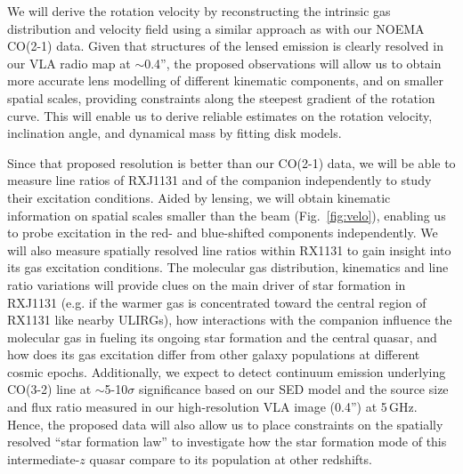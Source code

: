 \documentclass[11pt,a4paper,twoside,graphicx,color]{article}
\newcommand{\bco}{\mbox{CO(2-1)}\xspace}
\newcommand{\cco}{\mbox{CO(3-2)}\xspace}
\newcommand{\Fig}[1]{Fig.~\ref{fig:#1}}
\newcommand{\SF}{star formation\xspace}
\newcommand{\galpop}{galaxy populations\xspace}
\newcommand{\interz}{intermediate-$z$\xspace}
\newcommand{\obs}{observations\xspace}
\begin{document}
We will derive the rotation velocity by reconstructing the intrinsic gas distribution and velocity field using 
a similar approach as with our NOEMA \bco data.
Given that structures of the lensed emission is clearly resolved in our VLA radio map at $\sim$0.4'', %
the proposed \obs will allow us to obtain 
more accurate lens modelling of different kinematic components, and on smaller spatial scales,
providing constraints along the steepest gradient of the rotation curve.
This will enable us to derive reliable estimates on the rotation velocity, inclination angle, and
dynamical mass by fitting disk models.
 
%
Since that proposed resolution is better than our \bco data, we will be able to measure line ratios 
of RXJ1131 and of the companion independently to study their excitation conditions.
Aided by lensing, we will obtain kinematic information on spatial scales smaller than the beam (\Fig{velo}), 
enabling us to probe excitation in the red- and blue-shifted components independently.
We will also measure spatially resolved line ratios %
within RX1131 to gain insight into its gas excitation conditions.
The molecular gas distribution, kinematics and line ratio variations will provide clues on
the main driver of \SF in RXJ1131 (e.g. if the warmer gas is
concentrated toward the central region of RX1131 like nearby ULIRGs), 
how interactions with the companion influence the molecular gas 
in fueling its ongoing \SF and the central quasar,
and how does its gas excitation differ from other \galpop at different cosmic epochs.
%
%
Additionally, we expect to detect continuum emission underlying \cco line at $\sim$5-10$\sigma$ significance
based on our SED model and the source size and flux ratio measured in our high-resolution VLA image (0.4'') at 5\,GHz.
Hence, the proposed data will also allow us to place constraints on the spatially resolved 
``\SF law'' to investigate how the \SF mode of this \interz quasar 
compare to its population at other redshifts. %
\end{document}
